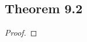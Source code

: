 \documentclass[../../main.tex]{subfiles}
\begin{document}
\subsection{Theorem 9.2}
\begin{wts}

\end{wts}
\begin{proof}

\end{proof}
\end{document}
